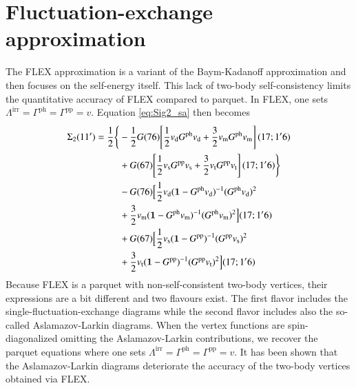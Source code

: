 \documentclass[aip,jcp,reprint,noshowkeys,superscriptaddress]{revtex4-1}
\newcommand{\bI}{\boldsymbol{1}}
\newcommand{\ph}{\text{ph}}
\newcommand{\pp}{\text{pp}}
\newcommand{\irr}{\text{irr}}
\begin{document}
\section{Fluctuation-exchange approximation}
The FLEX approximation is a variant of the Baym-Kadanoff approximation and then focuses on the self-energy itself.
This lack of two-body self-consistency limits the quantitative accuracy of FLEX compared to parquet.
In FLEX, one sets $\Lambda^\irr = \Gamma^\ph = \Gamma^\pp = v$.
Equation \eqref{eq:Sig2_sa} then becomes
\begin{equation}
\begin{split}
	\Sigma_2(11') 
	= \frac{1}{2} \Bigg\{ 
	& - \frac{1}{2} G(76) \qty[ 
	\frac{1}{2} v_\text{d} G^\ph v_\text{d} + \frac{3}{2} v_\text{m} G^\ph v_\text{m} ](17;1'6) 
	\\
	& + G(67) \qty[ \frac{1}{2} v_\text{s} G^\pp v_\text{s} + \frac{3}{2} v_\text{t} G^\pp v_\text{t} ](17;1'6)
	\Bigg\}
	\\
	& - G(76) \Big[ 
	\frac{1}{2} v_\text{d} (\bI - G^\ph v_\text{d})^{-1} (G^\ph v_\text{d})^2 
	\\
	& + \frac{3}{2} v_\text{m} (\bI - G^\ph v_\text{m})^{-1} (G^\ph v_\text{m})^2 
	\Big](17;1'6)
	\\
	& + G(67) \Big[ 
	\frac{1}{2} v_\text{s} (\bI - G^\pp)^{-1} (G^\pp v_\text{s})^2 
	\\
	& + \frac{3}{2} v_\text{t} (\bI - G^\pp)^{-1} (G^\pp v_\text{t})^2
	\Big](17;1'6)
\end{split}
\end{equation}
Because FLEX is a parquet with non-self-consistent two-body vertices, their expressions are a bit different and two flavours exist.
The first flavor includes the single-fluctuation-exchange diagrams while the second flavor includes also the so-called Aslamazov-Larkin diagrams.
When the vertex functions are spin-diagonalized omitting the Aslamazov-Larkin contributions, we recover the parquet equations where one sets $\Lambda^\irr = \Gamma^\ph = \Gamma^\pp = v$.
It has been shown that the Aslamazov-Larkin diagrams deteriorate the accuracy of the two-body vertices obtained via FLEX.




\end{document}
